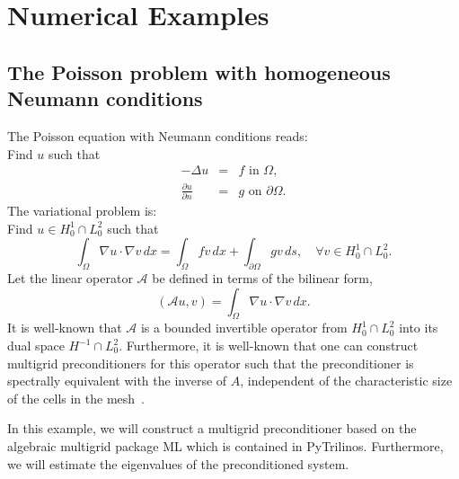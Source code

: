 \section{Numerical Examples}
\subsection{The Poisson problem with homogeneous Neumann conditions}
The Poisson equation with Neumann conditions reads: \\ 
Find $u$ such that
\begin{eqnarray*}
-\Delta u &= &f \mbox{ in } \Omega,  \\ 
    \frac{\partial u}{\partial n} &=&  g \mbox{ on } \partial \Omega . 
\end{eqnarray*}
The variational problem is: \\ 
Find $u\in H^1_0 \cap L^2_0$ such that 
\[
\int_\Omega \nabla u \cdot \nabla v \, dx = \int_\Omega f v \, dx + \int_{\partial \Omega} g v \, ds, \quad \forall v \in H^1_0 \cap L^2_0 .      
\]
Let the linear operator $\mathcal{A}$ be defined in terms of the  bilinear form,  
\[
(\mathcal{A} u, v) =  \int_\Omega \nabla u \cdot \nabla v \, dx.  
\]
It is well-known that 
$\mathcal{A}$ is a bounded invertible operator from $H^1_0 \cap L^2_0$ into its dual space $H^{-1}\cap L^2_0$. 
Furthermore, it is well-known that one can construct multigrid preconditioners for this operator
such that the preconditioner is spectrally equivalent with the inverse of $A$, independent of the
characteristic size of the cells in the mesh~\cite{JHBramble_1993a,Hackbusch, TOS2001}. 

In this example, we will construct a multigrid preconditioner based on the algebraic multigrid
package ML which is contained in PyTrilinos. Furthermore, we will estimate the eigenvalues
of the preconditioned system. 


